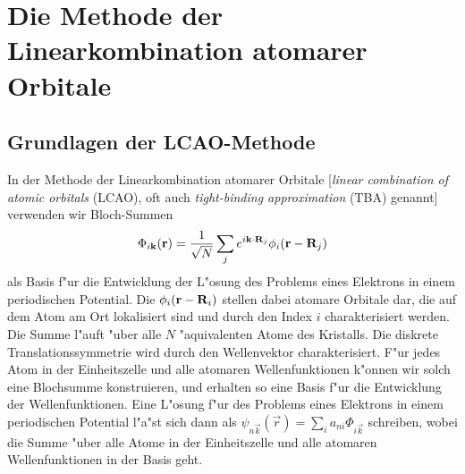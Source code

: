 


\chapter[Die LCAO-Methode]{Die Methode der Linearkombination atomarer Orbitale}
\label{cha:lcao}



\section{Grundlagen der LCAO-Methode}
\label{sec:lcao-allgemein}

In der Methode der Linearkombination atomarer Orbitale 
[\emph{linear combination of atomic orbitals} (LCAO), oft auch
\emph{tight-binding approximation} (TBA) genannt] verwenden wir Bloch-Summen
%
\begin{displaymath}
  \Phi_{i \vec{k}} (\vec{r}) = \frac{1}{\sqrt{N}} \sum_{j} e^{i
  \sprod{k}{R_{\mathnormal{j}}}} \phi_{i} (\vec{r} - \vec{R_{\mathnormal{j}}})
\end{displaymath}
%
als Basis f"ur die Entwicklung der L"osung des Problems eines Elektrons in
einem periodischen Potential. Die $\phi_{i} (\vec{r} -
\vec{R_{\mathnormal{i}}})$ stellen dabei atomare Orbitale dar, die auf dem
Atom am Ort  lokalisiert sind und durch den Index $i$
charakterisiert werden.  Die Summe l"auft "uber alle $N$ "aquivalenten Atome
des Kristalls. Die diskrete Translationssymmetrie wird durch den Wellenvektor
 charakterisiert. F"ur jedes Atom in der Einheitszelle und alle
atomaren Wellenfunktionen k"onnen wir solch eine Blochsumme konstruieren, und
erhalten so eine Basis f"ur die Entwicklung der Wellenfunktionen. Eine L"osung
f"ur des Problems eines Elektrons in einem periodischen Potential l"a"st sich
dann als $\psi_{n\vec{k}}(\vec{r}) = \sum_{i} a_{ni} \Phi_{i \vec{k}}$
schreiben, wobei die Summe "uber alle Atome in der Einheitszelle und alle
atomaren Wellenfunktionen in der Basis geht.


